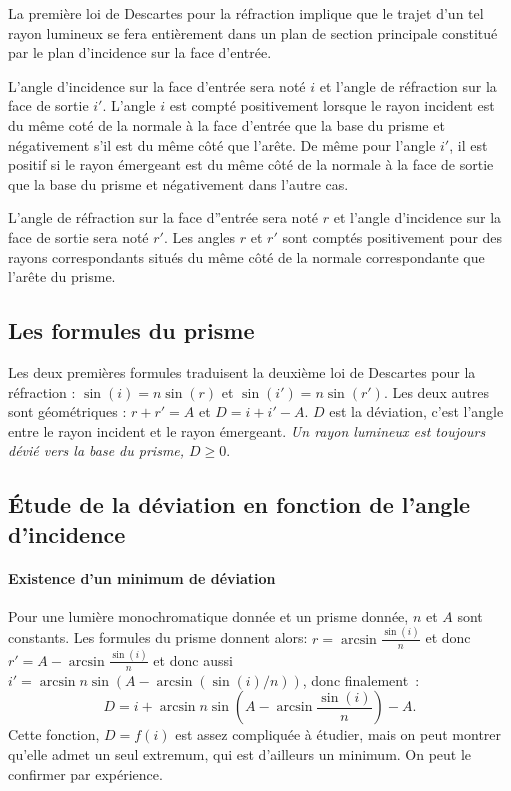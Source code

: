 La première loi de Descartes pour la réfraction implique que le trajet d'un tel rayon lumineux se fera entièrement dans un plan de section principale constitué par le plan d'incidence sur la face d'entrée.

L'angle d'incidence sur la face d'entrée sera noté $i$ et l'angle de réfraction sur la face de sortie $i'$. L'angle $i$ est compté positivement lorsque le rayon incident est du même coté de la normale à la face d'entrée que la base du prisme et négativement s'il est du même côté que l'arête. De même pour l'angle $i'$, il est positif si le rayon émergeant est du même côté de la normale à la face de sortie que la base du prisme et négativement dans l'autre cas.

L'angle de réfraction sur la face d''entrée sera noté $r$ et l'angle d'incidence sur la face de sortie sera noté $r'$. Les angles $r$ et $r'$ sont comptés positivement pour des rayons correspondants situés du même côté de la normale correspondante que l'arête du prisme.

\subsection{Les formules du prisme}
\label{chap6-subsec:formulesprisme}

Les deux premières formules traduisent la deuxième loi de Descartes pour la réfraction : $\sin(i) = n\sin(r)$ et $\sin(i') = n\sin(r')$. Les deux autres sont géométriques : $r+r'=A$ et $D=i+i'-A$. $D$ est la déviation, c'est l'angle entre le rayon incident et le rayon émergeant. \emph{Un rayon lumineux est toujours dévié vers la base du prisme, $D \geq 0$}.

\subsection{Étude de la déviation en fonction de l'angle d'incidence}
\label{chap6-subsec:etudedeviation}
\paragraph{Existence d'un minimum de déviation}

Pour une lumière monochromatique donnée et un prisme donnée, $n$ et $A$ sont constants. Les formules du prisme donnent alors:
$r = \arcsin{\frac{\sin(i)}{n}}$ et donc $r'=A - \arcsin{\frac{\sin(i)}{n}}$ et donc aussi $i' = \arcsin n\sin (A-\arcsin(\sin(i)/n))$, donc finalement~:
\begin{equation}
  D = i + \arcsin{n\sin\left(A-\arcsin{\frac{\sin(i)}{n}}\right)} -A.
\end{equation}
Cette fonction, $D=f(i)$ est assez compliquée à étudier, mais on peut montrer qu'elle admet un seul extremum, qui est d'ailleurs un minimum. On peut le confirmer par expérience.

